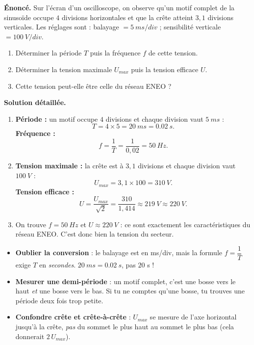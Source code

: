 \documentclass[11pt]{article}
\begin{document}
\begin{exoresolu}
\textbf{Énoncé.} Sur l'écran d'un oscilloscope, on observe qu'un motif complet de la sinusoïde occupe $4$ divisions horizontales et que la crête atteint $3,1$ divisions verticales. Les réglages sont : balayage $= \SI{5}{ms/div}$ ; sensibilité verticale $= \SI{100}{V/div}$.
\begin{enumerate}
\item Déterminer la période $T$ puis la fréquence $f$ de cette tension.
\item Déterminer la tension maximale $U_{max}$ puis la tension efficace $U$.
\item Cette tension peut-elle être celle du réseau ENEO ?
\end{enumerate}
\tcblower
\textbf{Solution détaillée.}
\begin{enumerate}
\item \textbf{Période :} un motif occupe $4$ divisions et chaque division vaut $\SI{5}{ms}$ :
\[ T = 4 \times 5 = \SI{20}{ms} = \SI{0,02}{s}. \]
\textbf{Fréquence :}
\[ f = \frac{1}{T} = \frac{1}{0,02} = \SI{50}{Hz}. \]
\item \textbf{Tension maximale :} la crête est à $3,1$ divisions et chaque division vaut $\SI{100}{V}$ :
\[ U_{max} = 3,1 \times 100 = \SI{310}{V}. \]
\textbf{Tension efficace :}
\[ U = \frac{U_{max}}{\sqrt{2}} = \frac{310}{1,414} \approx \SI{219}{V} \approx \SI{220}{V}. \]
\item On trouve $f = \SI{50}{Hz}$ et $U \approx \SI{220}{V}$ : ce sont exactement les caractéristiques du réseau ENEO. C'est donc bien la tension du secteur.
\end{enumerate}
\end{exoresolu}

\begin{attention}
\begin{itemize}
\item \textbf{Oublier la conversion} : le balayage est en ms/div, mais la formule $f = \dfrac{1}{T}$ exige $T$ en \emph{secondes}. $\SI{20}{ms} = \SI{0,02}{s}$, pas $20$ s !
\item \textbf{Mesurer une demi-période} : un motif complet, c'est une bosse vers le haut \emph{et} une bosse vers le bas. Si tu ne comptes qu'une bosse, tu trouves une période deux fois trop petite.
\item \textbf{Confondre crête et crête-à-crête} : $U_{max}$ se mesure de l'axe horizontal jusqu'à la crête, \emph{pas} du sommet le plus haut au sommet le plus bas (cela donnerait $2\,U_{max}$).
\end{itemize}
\end{attention}
\end{document}
